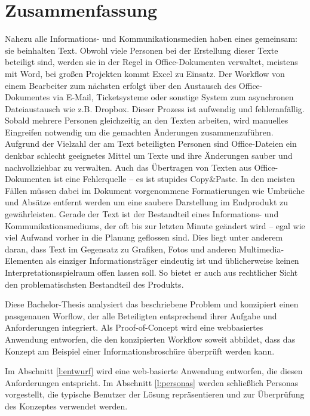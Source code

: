 \section*{Zusammenfassung}

\TODO

Nahezu alle Informations- und Kommunikationsmedien haben eines gemeinsam: sie beinhalten Text. Obwohl viele Personen bei der Erstellung dieser Texte beteiligt sind, werden sie in der Regel in Office-Dokumenten verwaltet, meistens mit Word, bei großen Projekten kommt Excel zu Einsatz. Der Workflow von einem Bearbeiter zum nächsten erfolgt über den Austausch des Office-Dokumentes via E-Mail, Ticketsysteme oder sonstige System zum asynchronen Dateiaustausch wie z.B. Dropbox. Dieser Prozess ist aufwendig und fehleranfällig. Sobald mehrere Personen gleichzeitig an den Texten arbeiten, wird manuelles Eingreifen notwendig um die gemachten Änderungen zusammenzuführen. Aufgrund der Vielzahl der am Text beteiligten Personen sind Office-Dateien ein denkbar schlecht geeignetes Mittel um Texte und ihre Änderungen sauber und nachvollziehbar zu verwalten. Auch das Übertragen von Texten aus Office-Dokumenten ist eine Fehlerquelle – es ist stupides Copy\&\-Paste. In den meisten Fällen müssen dabei im Dokument vorgenommene Formatierungen wie Umbrüche und Absätze entfernt werden um eine saubere Darstellung im Endprodukt zu gewährleisten. Gerade der Text ist der Bestandteil eines Informations- und Kommunikationsmediums, der oft bis zur letzten Minute geändert wird – egal wie viel Aufwand vorher in die Planung geflossen sind. Dies liegt unter anderem daran, dass Text im Gegensatz zu Grafiken, Fotos und anderen Multimedia-Elementen als einziger Informationsträger eindeutig ist und üblicherweise keinen Interpretationsspielraum offen lassen soll. So bietet er auch aus rechtlicher Sicht den problematischsten Bestandteil des Produkts.

Diese Bachelor-Thesis analysiert das beschriebene Problem und konzipiert einen passgenauen Worflow, der alle Beteiligten entsprechend ihrer Aufgabe und Anforderungen integriert. Als Proof-of-Concept wird eine webbasiertes Anwendung entworfen, die den konzipierten Workflow soweit abbildet, dass das Konzept am Beispiel einer Informationsbroschüre überprüft werden kann. 

Im Abschnitt \ref{l:entwurf} wird eine web-basierte Anwendung entworfen, die diesen Anforderungen entspricht. Im Abschnitt \ref{l:personas} werden schließlich Personas vorgestellt, die typische Benutzer der Lösung repräsentieren und zur Überprüfung des Konzeptes verwendet werden.

\pagebreak
